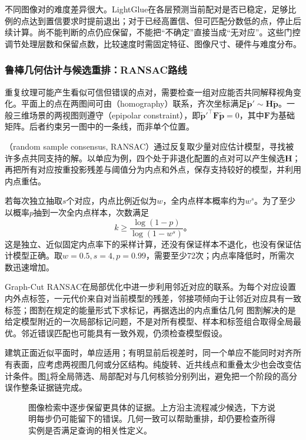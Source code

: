 不同图像对的难度差异很大。LightGlue在各层预测当前配对是否已稳定，足够比例的点达到置信要求时提前退出；对于已经高置信、但可匹配分数低的点，停止后续计算。尚不能判断的点仍应保留，不能把“不确定”直接当成“无对应”。这些门控调节处理层数和保留点数，比较速度时需固定特征、图像尺寸、硬件与难度分布。

\subsubsection{鲁棒几何估计与候选重排：RANSAC路线}
\label{sec:vision-recognition-ransac}

重复纹理可能产生看似可信但错误的点对，需要检查一组对应能否共同解释视角变化。平面上的点在两图间可由（homography）联系，齐次坐标满足$\tilde{\bm{p}}'\sim\bm{H}\tilde{\bm{p}}$。一般三维场景的两视图则遵守（epipolar constraint），即$\tilde{\bm{p}}'^\top\bm{F}\tilde{\bm{p}}=0$，其中$\bm{F}$为基础矩阵。后者约束另一图中的一条线，而非单个位置。

（random sample consensus, RANSAC）通过反复取少量对应估计模型，寻找被许多点共同支持的解。以单应为例，四个处于非退化配置的点对可以产生候选$\bm{H}$；再把所有对应按重投影残差与阈值分为内点和外点，保存支持较好的模型，并利用内点重估。

若每次独立抽取$s$个对应，内点比例近似为$w$，全内点样本概率约为$w^s$。为了至少以概率$p$抽到一次全内点样本，次数满足
\begin{equation}
 k\geq\frac{\log(1-p)}{\log(1-w^s)}\text{。}
 \label{eq:vision-ransac-iterations}
\end{equation}
这是独立、近似固定内点率下的采样计算，还没有保证样本不退化，也没有保证估计模型正确。取$w=0.5,s=4,p=0.99$，需要至少72次；内点率降低时，所需次数迅速增加。

Graph-Cut RANSAC在局部优化中进一步利用邻近对应的联系。为每个对应设置内外点标签，一元代价来自对当前模型的残差，邻接项倾向于让邻近对应具有一致标签；图割在规定的能量形式下求标记，再据选出的内点重估几何
图割解决的是给定模型附近的一次局部标记问题，不是对所有模型、样本和标签组合取得全局最优。邻近错误匹配也可能具有一致外观，仍须检查模型假设。

建筑正面近似平面时，单应适用；有明显前后视差时，同一个单应不能同时对齐所有表面，应考虑两视图几何或分区结构。纯旋转、近共线点和重叠太少也会改变估计条件。图\ref{fig:vision-retrieval-evidence}将全局筛选、局部配对与几何核验分别列出，避免把一个阶段的高分误作整条证据链完成。

\begin{figure}[htbp]
 \centering
 
 \caption{图像检索中逐步保留更具体的证据。上方沿主流程减少候选，下方说明每步仍可能留下的错误。几何一致可以帮助重排，却仍要检查所得实例是否满足查询的相关性定义。}
 \label{fig:vision-retrieval-evidence}
\end{figure}

